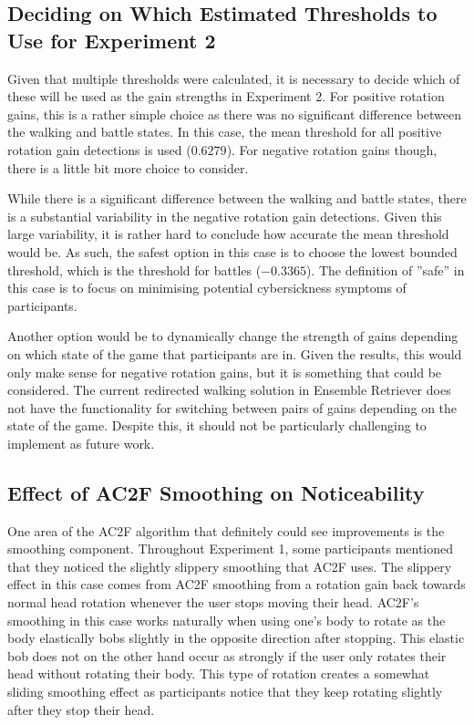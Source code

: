 \subsection{Deciding on Which Estimated Thresholds to Use for Experiment 2}
Given that multiple thresholds were calculated, it is necessary to decide which of these will be used as the gain strengths in Experiment 2. For positive rotation gains, this is a rather simple choice as there was no significant difference between the walking and battle states. In this case, the mean threshold for all positive rotation gain detections is used ($0.6279$). For negative rotation gains though, there is a little bit more choice to consider.

While there is a significant difference between the walking and battle states, there is a substantial variability in the negative rotation gain detections. Given this large variability, it is rather hard to conclude how accurate the mean threshold would be. As such, the safest option in this case is to choose the lowest bounded threshold, which is the threshold for battles ($-0.3365$). The definition of ''safe'' in this case is to focus on minimising potential cybersickness symptoms of participants. 

Another option would be to dynamically change the strength of gains depending on which state of the game that participants are in. Given the results, this would only make sense for negative rotation gains, but it is something that could be considered. The current redirected walking solution in Ensemble Retriever does not have the functionality for switching between pairs of gains depending on the state of the game. Despite this, it should not be particularly challenging to implement as future work.

\subsection{Effect of AC2F Smoothing on Noticeability}
One area of the AC2F algorithm that definitely could see improvements is the smoothing component. Throughout Experiment 1, some participants mentioned that they noticed the slightly slippery smoothing that AC2F uses. The slippery effect in this case comes from AC2F smoothing from a rotation gain back towards normal head rotation whenever the user stops moving their head. AC2F's smoothing in this case works naturally when using one's body to rotate as the body elastically bobs slightly in the opposite direction after stopping. This elastic bob does not on the other hand occur as strongly if the user only rotates their head without rotating their body. This type of rotation creates a somewhat sliding smoothing effect as participants notice that they keep rotating slightly after they stop their head. 

